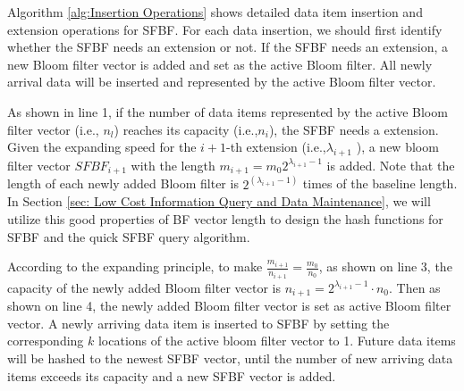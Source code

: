 \documentclass[10pt,journal,letterpaper]{IEEEtran}
\begin{document}
Algorithm \ref{alg:Insertion Operations} shows detailed data item insertion and extension  operations for SFBF. For each data insertion, we should first identify whether the SFBF needs an extension or not. If the SFBF needs an extension, a new Bloom filter vector is added and set as the active Bloom filter. All newly arrival data will be inserted and represented by the active Bloom filter vector.

As shown in line 1, if the number of data items represented by the active Bloom filter vector (i.e., $n_l$) reaches its capacity (i.e.,${n_i}$), the SFBF needs a extension. Given the expanding speed for the $i+1$-th extension (i.e.,${\lambda _{i+1}}$ ), a new bloom filter vector $SFBF_{i+1}$ with the length ${m_{i+1}} = {m_0}{2^{{\lambda_{i+1}}-1}}$ is added. Note that the length of each newly added Bloom filter is ${2^{\left( {{\lambda _{i+1}} - 1} \right)}}$ times of the baseline length. In Section \ref{sec: Low Cost Information Query and Data Maintenance}, we will utilize this  good properties of BF vector length  to design the hash functions for SFBF and the quick SFBF query algorithm.

According to the expanding principle, to make $\frac{{{m_{i + 1}}}}{{{n_{i + 1}}}} = \frac{{{m_0}}}{{{n_0}}}$,  as shown on line 3, the capacity of the newly added Bloom filter vector is ${n_{i + 1}} = {2^{{\lambda_{i+1} } - 1}} \cdot {n_0}$. Then as shown  on line 4, the newly added Bloom filter vector is set as active Bloom filter vector. A newly arriving data item is inserted to SFBF by setting the corresponding $k$ locations of the active bloom filter vector to 1. Future data items will be hashed to the newest SFBF vector, until  the number of new arriving data items exceeds its capacity and a new SFBF vector is added.
\end{document}
